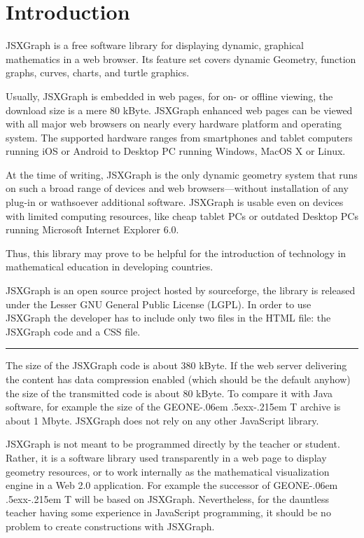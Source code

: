 \documentclass[12pt,a4paper]{article}%
\def\GEONExT{GEONE\kern-.06em \lower.5ex\hbox{x}\kern-.215em T}
\begin{document}
\section{Introduction}
JSXGraph is a free software library for displaying dynamic, graphical mathematics in a web browser.
Its feature set covers dynamic Geometry,  function graphs, curves, 
charts, and turtle graphics.

Usually, JSXGraph is embedded in web pages, for on- or off\/line viewing, the download size is a mere
80 kByte.
JSXGraph enhanced web pages can be viewed with all major web browsers on nearly every hardware platform and operating system.
The supported hardware ranges from smartphones and tablet computers running iOS or Android  to
Desktop PC running Windows, MacOS X or Linux.

At the time of writing, JSXGraph is the only dynamic geometry system that runs  on such a broad range of 
devices and web browsers---without installation of any plug-in or wathsoever additional software.
JSXGraph is usable even on devices with limited computing resources, like cheap tablet PCs or
outdated Desktop PCs running Microsoft Internet Explorer 6.0. 

Thus, this library may prove to be helpful for the
introduction of technology in mathematical education in developing countries.




JSXGraph is an open source project hosted by sourceforge, 
the library is released under the Lesser GNU General Public License (LGPL). 
In order to use JSXGraph the developer has to include only two files in the 
HTML file: the JSXGraph code and a CSS file. 

\bigskip
\hrule
\bigskip

The  size 
of the JSXGraph code is about 380 kByte. If the web server delivering the 
content has data compression enabled (which should be the default anyhow) the 
size of the transmitted code is about 80 kByte. To compare it with Java software, 
for example the size of the \GEONExT{} archive is about 1 Mbyte. JSXGraph does not 
rely on any other JavaScript library.

JSXGraph is not meant to be programmed directly by the teacher or student. Rather, 
it is a software library used transparently in a web page to display geometry 
resources, or to work internally as the mathematical visualization engine in a 
Web 2.0 application. For example the successor of \GEONExT{} will be based on 
JSXGraph. Nevertheless, for the dauntless teacher having some experience in 
JavaScript programming, it should be no problem to create  constructions with 
JSXGraph.
\end{document}
